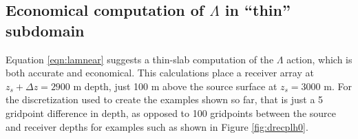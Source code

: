 \documentclass[georeport,12pt]{geophysics}
\begin{document}




\subsection{Economical computation of $\Lambda$ in ``thin'' subdomain}
Equation \ref{eqn:lamnear} suggests a thin-slab computation of the
$\Lambda$ action, which is both accurate and economical. 
This calculations
place a receiver array at $z_s+\Delta z=2900$ m depth, just 100 m above the
source surface at $z_s=3000$ m. For the discretization used to create
the examples shown so far, that is just a 5 gridpoint difference in
depth, as opposed to 100 gridpoints between the source and receiver
depths for examples such as shown in Figure \ref{fig:drecplh0}.
\end{document}
